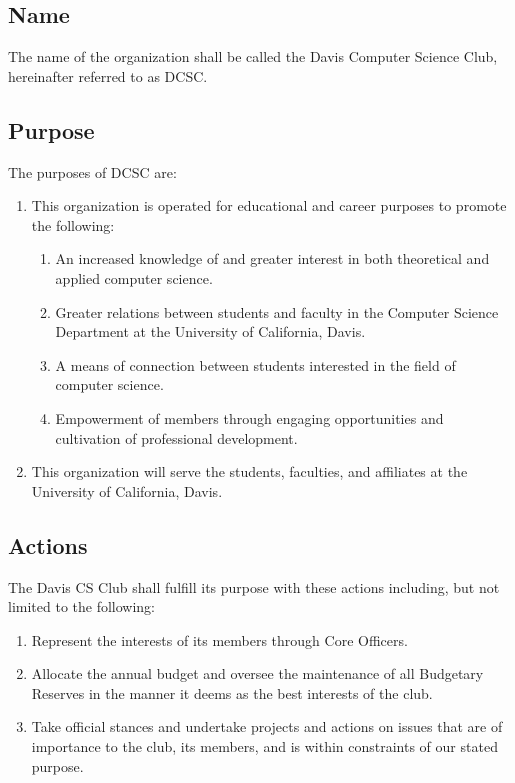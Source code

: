 \documentclass{article}
\newenvironment{li}{
\begin{enumerate}
  \setlength{\itemsep}{1pt}
  \setlength{\parskip}{0pt}
  \setlength{\parsep}{0pt}
}{\end{enumerate}}
\begin{document}
\subsection{Name}

The name of the organization shall be called the Davis Computer Science Club, hereinafter referred to as DCSC.

\subsection{Purpose}
The purposes of DCSC are:
\begin{li}
	\item This organization is operated for educational and career purposes to promote the following:
	\begin{li}
		\item An increased knowledge of and greater interest in both theoretical and applied computer science.
		\item Greater relations between students and faculty in the Computer Science Department at the University of California, Davis.
		\item A means of connection between students interested in the field of computer science.
		\item Empowerment of members through engaging opportunities and cultivation of professional development.
	\end{li}
	\item This organization will serve the students, faculties, and affiliates at the University of California, Davis.
\end{li}

\subsection{Actions}
The Davis CS Club shall fulfill its purpose with these actions including, but not limited to the following:
\begin{li}
\item Represent the interests of its members through Core Officers.
\item Allocate the annual budget and oversee the maintenance of all Budgetary Reserves in the manner it deems as the best interests of the club.
\item Take official stances and undertake projects and actions on issues that are of importance to the club, its members, and is within constraints of our stated purpose.
\end{li}
\end{document}
